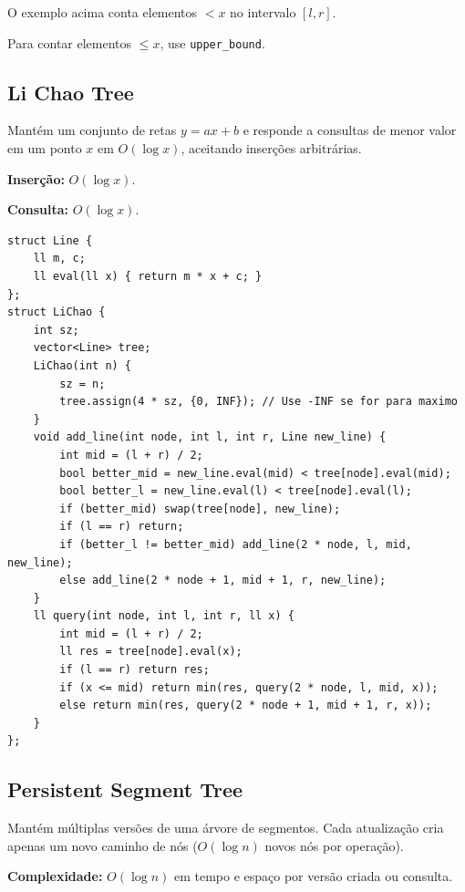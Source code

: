 O exemplo acima conta elementos $<x$ no intervalo $[l,r]$.

Para contar elementos $\leq x$, use \texttt{upper\_bound}.


\subsection{Li Chao Tree}

Mantém um conjunto de retas $y = ax + b$ e responde a consultas de menor valor em um ponto $x$ em $O(\log x)$, aceitando inserções arbitrárias.

\textbf{Inserção:} $O(\log x)$.

\textbf{Consulta:} $O(\log x)$.

\begin{lstlisting}
struct Line {
    ll m, c;
    ll eval(ll x) { return m * x + c; }
};
struct LiChao {
    int sz;
    vector<Line> tree;
    LiChao(int n) {
        sz = n;
        tree.assign(4 * sz, {0, INF}); // Use -INF se for para maximo
    }
    void add_line(int node, int l, int r, Line new_line) {
        int mid = (l + r) / 2;
        bool better_mid = new_line.eval(mid) < tree[node].eval(mid);
        bool better_l = new_line.eval(l) < tree[node].eval(l);
        if (better_mid) swap(tree[node], new_line);
        if (l == r) return;
        if (better_l != better_mid) add_line(2 * node, l, mid, new_line);
        else add_line(2 * node + 1, mid + 1, r, new_line);
    }
    ll query(int node, int l, int r, ll x) {
        int mid = (l + r) / 2;
        ll res = tree[node].eval(x);
        if (l == r) return res;
        if (x <= mid) return min(res, query(2 * node, l, mid, x));
        else return min(res, query(2 * node + 1, mid + 1, r, x));
    }
};
\end{lstlisting}


\subsection{Persistent Segment Tree}

Mantém múltiplas versões de uma árvore de segmentos. Cada atualização cria apenas um novo caminho de nós ($O(\log n)$ novos nós por operação).

\textbf{Complexidade:} $O(\log n)$ em tempo e espaço por versão criada ou consulta.

